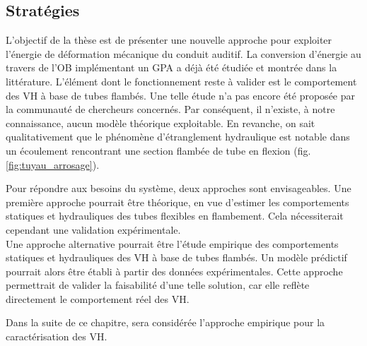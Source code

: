 	\subsection{Stratégies}
	\label{subsec:4.1.2 - Strategies}
L'objectif de la thèse est de présenter une nouvelle approche pour exploiter l'énergie de déformation mécanique du conduit auditif. La conversion d'énergie au travers de l'OB implémentant un GPA a déjà été étudiée et montrée dans la littérature. L'élément dont le fonctionnement reste à valider est le comportement des VH à base de tubes flambés. Une telle étude n'a pas encore été proposée par la communauté de chercheurs concernés. Par conséquent, il n'existe, à notre connaissance, aucun modèle théorique exploitable. En revanche, on sait qualitativement que le phénomène d'étranglement hydraulique est notable dans un écoulement rencontrant une section flambée de tube en flexion (fig. \ref{fig:tuyau_arrosage}).

Pour répondre aux besoins du système, deux approches sont envisageables. Une première approche pourrait être théorique, en vue d'estimer les comportements statiques et hydrauliques des tubes flexibles en flambement. Cela nécessiterait cependant une validation expérimentale.\\
Une approche alternative pourrait être l'étude empirique des comportements statiques et hydrauliques des VH à base de tubes flambés. Un modèle prédictif pourrait alors être établi à partir des données expérimentales. Cette approche permettrait de valider la faisabilité d'une telle solution, car elle reflète directement le comportement réel des VH.

Dans la suite de ce chapitre, sera considérée l'approche empirique pour la caractérisation des VH. 
